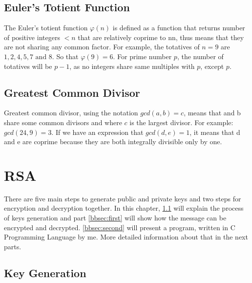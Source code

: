 \documentclass[a4paper, 12pt]{article}
\begin{document}
\subsection{Euler's Totient Function}
\label{bsec:euler}

The Euler's totient function $\varphi(n)$ is defined as a function that returns number of positive integers
$<n$ that are relatively coprime to nn, thus means that they are not sharing any common factor. For
example, the totatives of $n = 9$ are $1, 2, 4, 5, 7 \text{ and } 8$. So that $\varphi(9) = 6$. For prime number $p$, the
number of totatives will be $p - 1$, as no integers share same multiples with $p$, except $p$.

\subsection{Greatest Common Divisor}
\label{bsec:gcd}

Greatest common divisor, using the notation $gcd(a,b)=c$, means that and b share some common
divisors and where $c$ is the largest divisor. For example: $gcd(24,9)=3$. If we have an
expression that $gcd(d,e)=1$, it means that d and e are coprime because they are both integrally
divisible only by one.

\section{RSA}
\label{sec:rsa}

There are five main steps to generate public and private keys and two steps for encryption and
decryption together. In this chapter, \ref{bsec:key} will explain the process of keys generation and part
\ref{bbsec:first} will show how the message can be encrypted and decrypted. \ref{bbsec:second} will present a program, written
in C Programming\cite{Clang} Language by me. More detailed information about that in the next parts.

\subsection{Key Generation}
\label{bsec:key}
\end{document}
